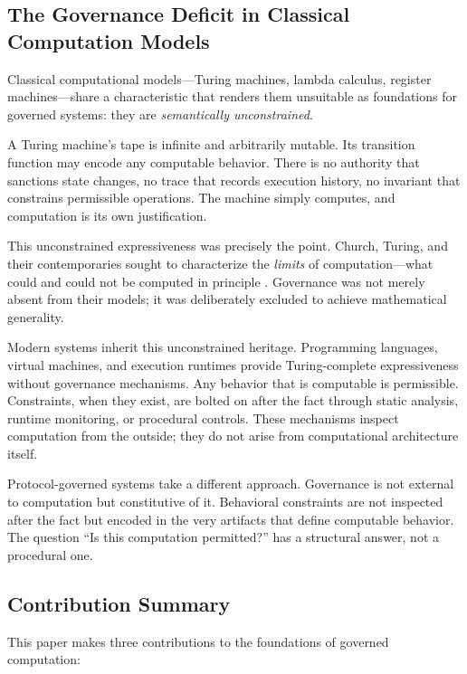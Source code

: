 \documentclass[11pt,a4paper]{article}
\begin{document}
\subsection{The Governance Deficit in Classical Computation Models}

Classical computational models---Turing machines, lambda calculus, register machines---share a characteristic that renders them unsuitable as foundations for governed systems: they are \emph{semantically unconstrained}.

A Turing machine's tape is infinite and arbitrarily mutable. Its transition function may encode any computable behavior. There is no authority that sanctions state changes, no trace that records execution history, no invariant that constrains permissible operations. The machine simply computes, and computation is its own justification.

This unconstrained expressiveness was precisely the point. Church, Turing, and their contemporaries sought to characterize the \emph{limits} of computation---what could and could not be computed in principle \citep{church1936unsolvable}. Governance was not merely absent from their models; it was deliberately excluded to achieve mathematical generality.

Modern systems inherit this unconstrained heritage. Programming languages, virtual machines, and execution runtimes provide Turing-complete expressiveness without governance mechanisms. Any behavior that is computable is permissible. Constraints, when they exist, are bolted on after the fact through static analysis, runtime monitoring, or procedural controls. These mechanisms inspect computation from the outside; they do not arise from computational architecture itself.

Protocol-governed systems take a different approach. Governance is not external to computation but constitutive of it. Behavioral constraints are not inspected after the fact but encoded in the very artifacts that define computable behavior. The question ``Is this computation permitted?'' has a structural answer, not a procedural one.

\subsection{Contribution Summary}

This paper makes three contributions to the foundations of governed computation:
\end{document}
